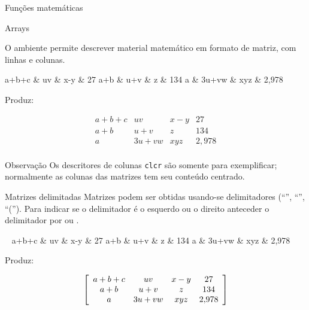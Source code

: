 \begin{frame}{Funções matemáticas}
\begin{LaTeXcode}
    
     
      
     
      
\end{LaTeXcode}
\end{frame}

\begin{frame}{Arrays}
\fontsize{10}{11}\selectfont

O ambiente  permite descrever material matemático em formato de matriz, com linhas e  colunas.

\begin{LaTeXcode}[Exemplo]
\n
a+b+c \& uv    \& x-y \& 27  \LCmd{\bs}\n
a+b   \& u+v   \& z   \& 134 \LCmd{\bs}\n
a     \& 3u+vw \& xyz \& 2,978 \LCmd{\bs}\n
{}
\end{LaTeXcode}
Produz:
\begin{LaTeXoutput}
\[
\begin{array}{clcr}
a+b+c & uv    & x-y & 27  \\
a+b   & u+v   & z   & 134 \\
a     & 3u+vw & xyz & 2{,}978 \\
\end{array}
\]
\end{LaTeXoutput}

\begin{block}{Observação}
Os descritores de colunas \texttt{clcr} são somente para exemplificar; normalmente as colunas das matrizes tem seu conteúdo centrado.
\end{block}
\end{frame}

\begin{frame}{Matrizes delimitadas}
Matrizes podem ser obtidas usando-se delimitadores (``\lb'', ``\ls'', 
``(''). Para indicar se o delimitador é o esquerdo ou o direito 
anteceder o delimitador por  ou .

\begin{LaTeXcode}[Exemplo]
\LCmd{[} \ls\ 
\n
a+b+c \& uv    \& x-y \& 27  \LCmd{\bs}\n
a+b   \& u+v   \& z   \& 134 \LCmd{\bs}\n
a     \& 3u+vw \& xyz \& 2,978 \LCmd{\bs}\n
{}
\rs\ \LCmd{]}
\end{LaTeXcode}

Produz:
\begin{LaTeXoutput}
\[ \left [
\begin{array}{*4c}
a+b+c & uv    & x-y & 27  \\
a+b   & u+v   & z   & 134 \\
a     & 3u+vw & xyz & 2{,}978 \\
\end{array}
\right ] \]
\end{LaTeXoutput}
\end{frame}

